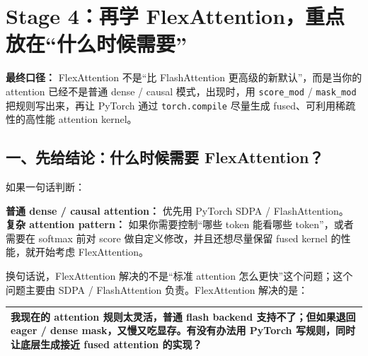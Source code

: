 
\section{Stage 4：再学 FlexAttention，重点放在“什么时候需要”}

\begin{conceptbox}
\textbf{最终口径：} FlexAttention 不是“比 FlashAttention 更高级的新默认”，而是当你的 attention 已经不是普通 dense / causal 模式，出现时，用 \texttt{score\_mod} / \texttt{mask\_mod} 把规则写出来，再让 PyTorch 通过 \texttt{torch.compile} 尽量生成 fused、可利用稀疏性的高性能 attention kernel。
\end{conceptbox}


\subsection{一、先给结论：什么时候需要 FlexAttention？}

如果一句话判断：

\begin{summarybox}
\textbf{普通 dense / causal attention：} 优先用 PyTorch SDPA / FlashAttention。\\
\textbf{复杂 attention pattern：} 如果你需要控制“哪些 token 能看哪些 token”，或者需要在 softmax 前对 score 做自定义修改，并且还想尽量保留 fused kernel 的性能，就开始考虑 FlexAttention。
\end{summarybox}

换句话说，FlexAttention 解决的不是“标准 attention 怎么更快”这个问题；这个问题主要由 SDPA / FlashAttention 负责。FlexAttention 解决的是：

\begin{center}
\begin{tabular}{p{13.2cm}}
\hline
我现在的 attention 规则太灵活，普通 flash backend 支持不了；但如果退回 eager / dense mask，又慢又吃显存。有没有办法用 PyTorch 写规则，同时让底层生成接近 fused attention 的实现？ \\
\hline
\end{tabular}
\end{center}

